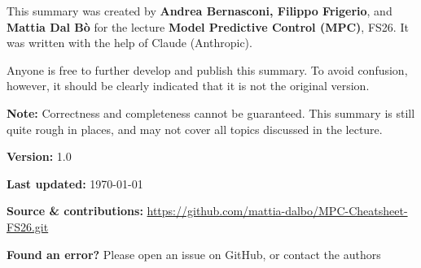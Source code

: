 \documentclass[8pt,landscape,a4paper]{extarticle}
\begin{document}
\setlength{\parindent}{0pt}
\setlength{\parskip}{1pt}
\setlength{\abovedisplayskip}{0pt}
\setlength{\belowdisplayskip}{0pt}
\setlength{\abovedisplayshortskip}{0pt}
\setlength{\belowdisplayshortskip}{0pt}

\begin{multicols*}{3}
\raggedright







\columnbreak
\begin{tcolorbox}[
    colback=white,
    colframe=red!70!black,
    arc=2pt,
    boxrule=1pt,
    title={\textbf{\color{white}Disclaimer}},
    colbacktitle=red!70!black,
    coltitle=white,
    fonttitle=\normalsize\bfseries,
    top=8pt, bottom=8pt, left=10pt, right=10pt
]
\raggedright
This summary was created by \textbf{Andrea Bernasconi, Filippo Frigerio}, and \textbf{Mattia Dal Bò} for the lecture \textbf{Model Predictive Control (MPC)}, FS26. It was written with the help of Claude (Anthropic).

\vspace{6pt}

Anyone is free to further develop and publish this summary. To avoid confusion, however, it should be clearly indicated that it is not the original version.

\vspace{6pt}

{\color{red!70!black}\textbf{Note:}} Correctness and completeness cannot be guaranteed. This summary is still quite rough in places, and may not cover all topics discussed in the lecture.

\vspace{6pt}

\textbf{Version:} 1.0

\vspace{4pt}

\textbf{Last updated:} \today

\vspace{4pt}

\textbf{Source \& contributions:} \url{https://github.com/mattia-dalbo/MPC-Cheatsheet-FS26.git}

\vspace{4pt}

\textbf{Found an error?} Please open an issue on GitHub, or contact the authors
\end{tcolorbox}

\end{multicols*}
\end{document}
